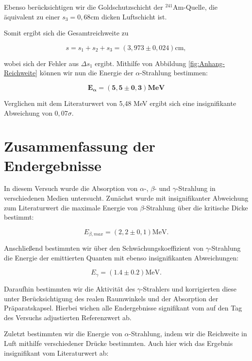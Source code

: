 \documentclass{article}
\begin{document}
Ebenso berücksichtigen wir die Goldschutzschicht der $^{241}$Am-Quelle, die äquivalent zu einer $s_3 = 0,68$cm dicken Luftschicht ist. 

Somit ergibt sich die Gesamtreichweite zu 

\begin{equation}
    s = s_1 + s_2 + s_3 = (3,973 \pm 0,024) \text{cm},
\end{equation}

wobei sich der Fehler aus $\Delta s_1$ ergibt. Mithilfe von Abbildung \ref{fig:Anhang-Reichweite} können wir nun die Energie der $\alpha$-Strahlung bestimmen:

\begin{equation}
    \bm{E_\alpha = (5,5 \pm 0,3)} \textbf{MeV}
\end{equation}

Verglichen mit dem Literaturwert von 5,48 MeV ergibt sich eine insignifikante Abweichung von $0,07\sigma$.


\clearpage
\newpage
\section{Zusammenfassung der Endergebnisse}

In diesem Versuch wurde die Absorption von $\alpha$-, $\beta$- und $\gamma$-Strahlung in verschiedenen Medien untersucht. Zunächst wurde mit insignifikanter Abweichung zum Literaturwert die maximale Energie von $\beta$-Strahlung über die kritische Dicke bestimmt:


\begin{equation}
    E_{\beta,max} = (2,2 \pm 0,1) \text{MeV}.
\end{equation}

Anschließend bestimmten wir über den Schwächungskoeffizient von $\gamma$-Strahlung die Energie der emittierten Quanten mit ebenso insignifikanten Abweichungen:

\begin{equation}
    {E_\gamma = (1.4 \pm 0.2)} \text{MeV}.
\end{equation}

Daraufhin bestimmten wir die Aktivität des $\gamma$-Strahlers und korrigierten diese unter Berücksichtigung des realen Raumwinkels und der Absorption der Präparatskapsel. Hierbei wichen alle Endergebnisse signifikant vom auf den Tag des Versuchs adjustierten Referenzwert ab.

Zuletzt bestimmten wir die Energie von $\alpha$-Strahlung, indem wir die Reichweite in Luft mithilfe verschiedener Drücke bestimmten. Auch hier wich das Ergebnis insignifikant vom Literaturwert ab:
\end{document}
